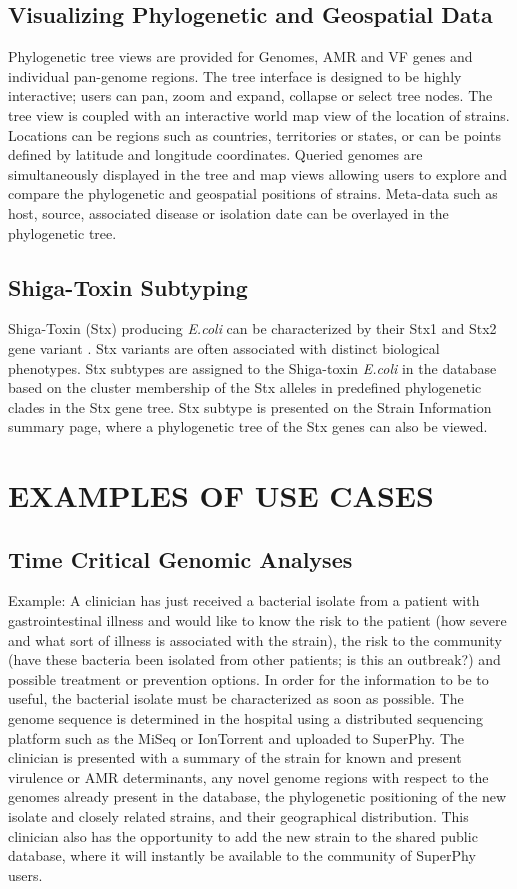 \documentclass[a4paper,twoside]{article}
\begin{document}
\subsection{Visualizing Phylogenetic and Geospatial Data}

Phylogenetic tree views are provided for Genomes, AMR and VF genes and individual pan-genome regions. The tree interface is designed to be highly interactive; users can pan, zoom and expand, collapse or select tree nodes. The tree view is coupled with an interactive world map view of the location of strains. Locations can be regions such as countries, territories or states, or can be points defined by latitude and longitude coordinates. Queried genomes are simultaneously displayed in the tree and map views allowing users to explore and compare the phylogenetic and geospatial positions of strains. Meta-data such as host, source, associated disease or isolation date can be overlayed in the phylogenetic tree.

\subsection{Shiga-Toxin Subtyping}

Shiga-Toxin (Stx) producing \textit{E.coli} can be characterized by their Stx1 and Stx2 gene variant \cite{scheutz_multicenter_2012}. Stx variants are often associated with distinct biological phenotypes. Stx subtypes are assigned to the Shiga-toxin \textit{E.coli} in the database based on the cluster membership of the Stx alleles in predefined phylogenetic clades in the Stx gene tree. Stx subtype is presented on the Strain Information summary page, where a phylogenetic tree of the Stx genes can also be viewed.

\section{\uppercase{Examples of Use Cases}}
\label{sec:cases}
\subsection{Time Critical Genomic Analyses}
Example: A clinician has just received a bacterial isolate from a patient with gastrointestinal illness and would like to know the risk to the patient (how severe and what sort of illness is associated with the strain), the risk to the community (have these bacteria been isolated from other patients; is this an outbreak?) and possible treatment or prevention options. In order for the information to be to useful, the bacterial isolate must be characterized as soon as possible. The genome sequence is determined in the hospital using a distributed sequencing platform such as the MiSeq or IonTorrent and uploaded to SuperPhy. The clinician is presented with a summary of the strain for known and present virulence or AMR determinants, any novel genome regions with respect to the genomes already present in the database, the phylogenetic positioning of the new isolate and closely related strains, and their geographical distribution. This clinician also has the opportunity to add the new strain to the shared public database, where it will instantly be available to the community of SuperPhy users.
\end{document}
